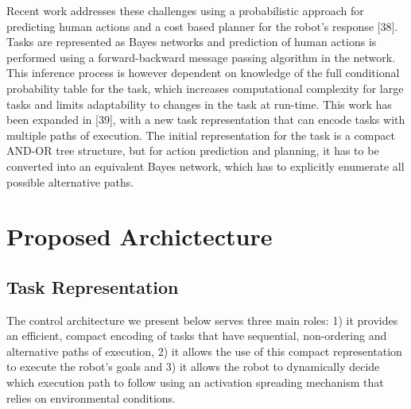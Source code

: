 \documentclass[letterpaper, 10 pt, conference]{ieeeconf}  %
\begin{document}
Recent work  addresses these challenges using a probabilistic approach for predicting human actions and a cost based planner for the robot’s response [38]. Tasks are represented as Bayes networks and prediction of human actions is performed using a forward-backward message passing algorithm in the network. This inference process is however dependent on knowledge of the full conditional probability table for the task, which increases computational complexity for large tasks and limits adaptability to changes in the task at run-time. This work has been expanded in [39], with a new task representation that can encode tasks with multiple paths of execution. The initial representation for the task is a compact AND-OR tree structure, but for action prediction and planning, it has to be converted into an equivalent Bayes network, which has to explicitly enumerate all possible alternative paths. 
\section{Proposed Archictecture}
\label{architecture}
\subsection{Task Representation}
\label{representation}
The control architecture we present below serves three main roles: 1) it provides an efficient, compact encoding of tasks that have sequential, non-ordering and alternative paths of execution, 2) it allows the use of this compact representation to execute the robot's goals and 3) it allows the robot to dynamically decide which execution path to follow using an activation spreading mechanism that relies on environmental conditions.
\end{document}
